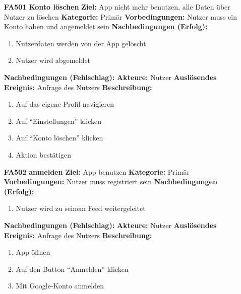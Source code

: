 \documentclass[parskip=full]{scrartcl}
\begin{document}
\begin{itemize}[nosep]
			\item[\textbf{FA501}]\textbf{Konto löschen}
							\newline \textbf{Ziel:} App nicht mehr benutzen, alle Daten über Nutzer zu löschen
							\newline \textbf{Kategorie:} Primär
							\newline \textbf{Vorbedingungen:} Nutzer muss ein Konto haben und angemeldet sein
							\newline \textbf{Nachbedingungen (Erfolg):} 
							\begin{enumerate}[nosep]
								\item Nutzerdaten werden von der App gelöscht
								\item Nutzer wird abgemeldet 
							\end{enumerate}
							\textbf{Nachbedingungen (Fehlschlag):}
							\newline \textbf{Akteure:} Nutzer
							\newline \textbf{Auslösendes Ereignis:} Anfrage des Nutzers
							\newline \textbf{Beschreibung:}
							\begin{enumerate}[nosep]
								\item Auf das eigene Profil navigieren
								\item Auf “Einstellungen” klicken
								\item Auf “Konto löschen” klicken
								\item Aktion bestätigen\\
							\end{enumerate}
			
			\item[\textbf{FA502}]\textbf{anmelden}
							\newline \textbf{Ziel:} App benutzen
							\newline \textbf{Kategorie:} Primär
							\newline \textbf{Vorbedingungen:} Nutzer muss registriert sein
							\newline \textbf{Nachbedingungen (Erfolg):} 
							\begin{enumerate}[nosep]
								\item Nutzer wird zu seinem \gls{Feed} weitergeleitet 
							\end{enumerate}
							\textbf{Nachbedingungen (Fehlschlag):}
							\newline \textbf{Akteure:} Nutzer
							\newline \textbf{Auslösendes Ereignis:} Anfrage des Nutzers
							\newline \textbf{Beschreibung:}
							\begin{enumerate}[nosep]
								\item App öffnen
								\item Auf den Button “Anmelden” klicken
								\item Mit Google-Konto anmelden\\
							\end{enumerate}
						

\end{itemize}
\end{document}
